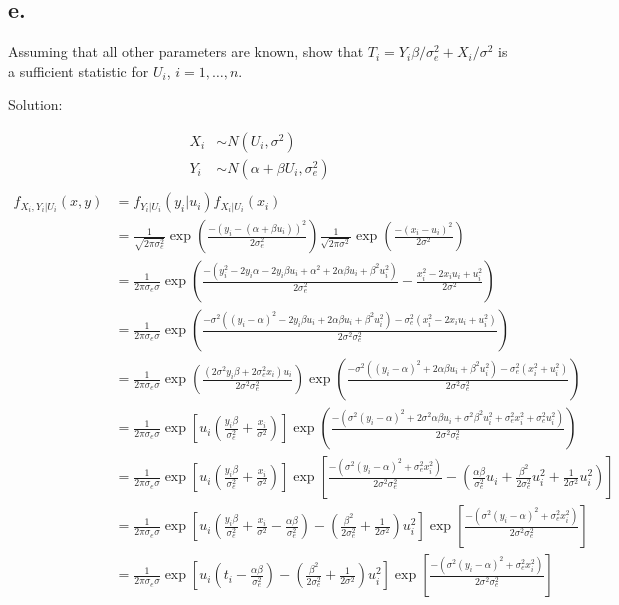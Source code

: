\documentclass[
  letterpaper,
  DIV=11,
  numbers=noendperiod]{scrreprt}
\begin{document}
\hypertarget{e.}{%
\subsection{e.}\label{e.}}

Assuming that all other parameters are known, show that
\(T_i = Y_i \beta/\sigma_{e}^2+X_i/\sigma^2\) is a sufficient statistic
for \(U_i\), \(i=1,\dots,n\).

Solution:

\[
\begin{aligned}
X_i  &\sim N(U_i, \sigma^2)\\
Y_i &  \sim N(\alpha + \beta U_i, \sigma^2_e) \\
\end{aligned}
\] \[
\begin{aligned}
f_{X_i,Y_i|U_i}(x,y)&=f_{Y_i|U_i}(y_i|u_i) f_{X_i|U_i}(x_i) \\
&=\frac{1}{\sqrt{2 \pi \sigma_{e}^2}}\exp \left(\frac{-(y_i -(\alpha +\beta u_i))^2}{2 \sigma_{e}^2}\right) \frac{1}{\sqrt{2 \pi \sigma^2}}\exp \left(\frac{-(x_i- u_i)^2}{2 \sigma^2}\right)   \\
&=\frac{1}{2 \pi \sigma_e \sigma}\exp \left(\frac{-(y_i^2 -2y_i\alpha - 2y_i \beta u_i +\alpha^2 +2\alpha \beta u_i + \beta^2u_i^2)}{2 \sigma_{e}^2}-\frac{x_i^2-2x_iu_i+ u_i^2}{2 \sigma^2}\right)   \\
&=\frac{1}{2 \pi \sigma_e \sigma}\exp \left(\frac{-\sigma^2((y_i-\alpha)^2 - 2y_i \beta u_i +2\alpha \beta u_i + \beta^2u_i^2)-\sigma_e^2(x_i^2-2x_iu_i+ u_i^2)}{2 \sigma^2\sigma_e^2}\right)   \\
&=\frac{1}{2 \pi \sigma_e \sigma}\exp \left(\frac{(2\sigma^2 y_i\beta +2\sigma_e^2x_i)u_i}{2\sigma^2\sigma^2_e}\right)\exp \left(\frac{-\sigma^2((y_i-\alpha)^2 +2\alpha \beta u_i + \beta^2u_i^2)-\sigma_e^2(x_i^2+ u_i^2)}{2 \sigma^2\sigma_e^2}\right)   \\
&=\frac{1}{2 \pi \sigma_e \sigma}\exp \left[ u_i\left(\frac{y_i\beta}{\sigma_e^2}+\frac{ x_i}{\sigma^2}\right)\right]\exp \left(\frac{-(\sigma^2(y_i-\alpha)^2 +2\sigma^2\alpha \beta u_i + \sigma^2\beta^2u_i^2+ \sigma_e^2x_i^2+\sigma_e^2u_i^2)}{2 \sigma^2\sigma_e^2}\right)   \\
&=\frac{1}{2 \pi \sigma_e \sigma}\exp \left[ u_i\left(\frac{y_i\beta}{\sigma_e^2}+\frac{ x_i}{\sigma^2}\right)\right]\exp \left[\frac{-(\sigma^2(y_i-\alpha)^2+ \sigma_e^2x_i^2)}{2 \sigma^2\sigma_e^2} -\left(\frac{\alpha \beta}{\sigma_e^2}u_i + \frac{\beta^2}{2\sigma_e^2}u_i^2+\frac{1}{2\sigma^2}u_i^2\right)\right]   \\
&=\frac{1}{2 \pi \sigma_e \sigma}\exp \left[ u_i\left(\frac{y_i\beta}{\sigma_e^2}+\frac{ x_i}{\sigma^2}-\frac{\alpha \beta}{\sigma_e^2}\right) -\left(\frac{\beta^2}{2\sigma_e^2}+\frac{1}{2\sigma^2}\right)u_i^2\right]\exp \left[\frac{-(\sigma^2(y_i-\alpha)^2+ \sigma_e^2x_i^2)}{2 \sigma^2\sigma_e^2}\right]\\
&=\frac{1}{2 \pi \sigma_e \sigma}\exp \left[ u_i\left(t_i-\frac{\alpha \beta}{\sigma_e^2}\right) -\left(\frac{\beta^2}{2\sigma_e^2}+\frac{1}{2\sigma^2}\right)u_i^2\right]\exp \left[\frac{-(\sigma^2(y_i-\alpha)^2+ \sigma_e^2x_i^2)}{2 \sigma^2\sigma_e^2}\right]\\
\end{aligned}
\]
\end{document}
